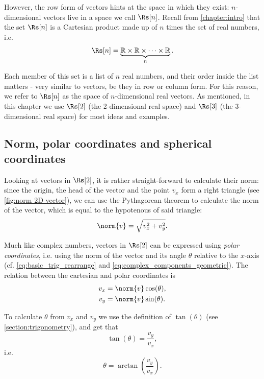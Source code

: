 However, the row form of vectors hints at the space in which they exist: $n$-dimensional vectors live in a space we call $\Rs[n]$. Recall from \autoref{chapter:intro} that the set $\Rs[n]$ is a Cartesian product made up of $n$ times the set of real numbers, i.e.
\begin{equation}
	\Rs[n] = \underbrace{\mathbb{R} \times \mathbb{R} \times \cdots \times \mathbb{R}}_{n}.
	\label{eq:Rn}
\end{equation}

Each member of this set is a list of $n$ real numbers, and their order inside the list matters - very similar to vectors, be they in row or column form. For this reason, we refer to $\Rs[n]$ as the space of $n$-dimensional real vectors. As mentioned, in this chapter we use $\Rs[2]$ (the 2-dimensional real space) and $\Rs[3]$ (the 3-dimensional real space) for most ideas and examples.

\subsection{Norm, polar coordinates and spherical coordinates}
Looking at vectors in $\Rs[2]$, it is rather straight-forward to calculate their norm: since the origin, the head of the vector and the point $v_{x}$ form a right triangle (see \autoref{fig:norm 2D vector}), we can use the Pythagorean theorem to calculate the norm of the vector, which is equal to the hypotenous of said triangle:
\begin{equation}
	\norm{v} = \sqrt{v_{x}^{2} + v_{y}^{2}}.
	\label{eq:2D vector norm}
\end{equation}

Much like complex numbers, vectors in $\Rs[2]$ can be expressed using \emph{polar coordinates}, i.e. using the norm of the vector and its angle $\theta$ relative to the $x$-axis (cf. \autoref{eq:basic_trig_rearrange} and \autoref{eq:complex_components_geometric}). The relation between the cartesian and polar coordinates is
\begin{align}
	v_{x} &= \norm{v}\cos(\theta),\nonumber\\
	v_{y} &= \norm{v}\sin(\theta).
	\label{eq:2D_polar_coords}
\end{align}

To calculate $\theta$ from $v_{x}$ and $v_{y}$ we use the definition of $\tan(\theta)$ (see \autoref{section:trigonometry}), and get that
\begin{equation}
	\tan(\theta) = \frac{v_{y}}{v_{x}},
	\label{eq:}
\end{equation}
i.e.
\begin{equation}
	\theta = \arctan \left( \frac{v_{y}}{v_{x}} \right).
	\label{eq:}
\end{equation}

